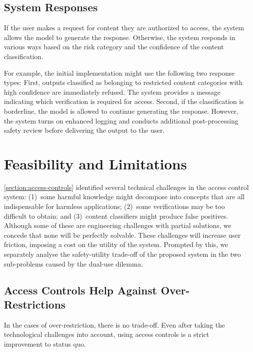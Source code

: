 \documentclass{article}
\theoremstyle{plain}
\theoremstyle{definition}
\theoremstyle{remark}
\begin{document}
\subsection{System Responses} \label{section:system-responses}

If the user makes a request for content they are authorized to access, the system allows the model to generate the response.
Otherwise, the system responds in various ways based on the risk category and the confidence of the content classification.

For example, the initial implementation might use the following two response types:
First, outputs classified as belonging to restricted content categories with high confidence are immediately refused.
The system provides a message indicating which verification is required for access.
Second, if the classification is borderline, the model is allowed to continue generating the response.
However, the system turns on enhanced logging and conducts additional post-processing safety review before delivering the output to the user.

\section{Feasibility and Limitations}
\label{section:feasibility-and-limitations}

\cref{section:access-controls} identified several technical challenges in the access control system: (1)~some harmful knowledge might decompose into concepts that are all indispensable for harmless applications; (2)~some verifications may be too difficult to obtain; and (3)~content classifiers might produce false positives.
Although some of these are engineering challenges with partial solutions, we concede that none will be perfectly solvable.
These challenges will increase user friction, imposing a cost on the utility of the system.
Prompted by this, we separately analyse the safety-utility trade-off of the proposed system in the two sub-problems caused by the dual-use dilemma.

\subsection{Access Controls Help Against Over-Restrictions}
\label{section:over-restriction}

In the cases of over-restriction, there is no trade-off.
Even after taking the technological challenges into account, using access controls is a strict improvement to status quo.
\end{document}

